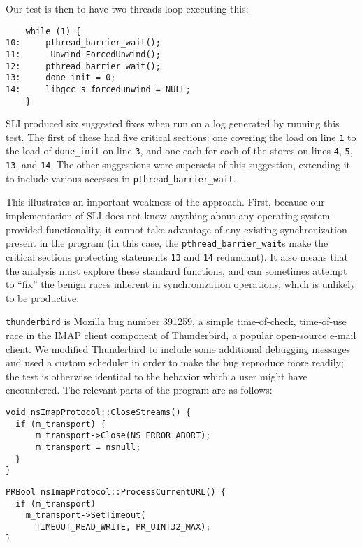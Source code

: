 \documentclass[10pt,twocolumn,preprint,natbib,authoryear]{sigplanconf}
\begin{document}
Our test is then to have two threads loop executing this:

\begin{verbatim}
    while (1) {
10:     pthread_barrier_wait();
11:     _Unwind_ForcedUnwind();
12:     pthread_barrier_wait();
13:     done_init = 0;
14:     libgcc_s_forcedunwind = NULL;
    }
\end{verbatim}

SLI produced six suggested fixes when run on a log generated by
running this test.  The first of these had five critical sections: one
covering the load on line \verb|1| to the load of \verb|done_init| on
line \verb|3|, and one each for each of the stores on lines \verb|4|,
\verb|5|, \verb|13|, and \verb|14|.  The other suggestions were
supersets of this suggestion, extending it to include various accesses
in \verb|pthread_barrier_wait|.

This illustrates an important weakness of the approach.  First,
because our implementation of SLI does not know anything about any
operating system-provided functionality, it cannot take advantage of
any existing synchronization present in the program (in this case, the
\verb|pthread_barrier_wait|s make the critical sections protecting
statements \verb|13| and \verb|14| redundant).  It also means that the
analysis must explore these standard functions, and can sometimes
attempt to ``fix'' the benign races inherent in synchronization
operations, which is unlikely to be productive.

\verb|thunderbird| is Mozilla bug number
391259\cite{thunderbird39125}, a simple time-of-check, time-of-use
race in the IMAP client component of Thunderbird, a popular
open-source e-mail client.  We modified Thunderbird to include some
additional debugging messages and used a custom scheduler in order to
make the bug reproduce more readily; the test is otherwise identical
to the behavior which a user might have encountered.  The relevant
parts of the program are as follows:

\begin{verbatim}
void nsImapProtocol::CloseStreams() {
  if (m_transport) {
      m_transport->Close(NS_ERROR_ABORT);
      m_transport = nsnull;
  }
}
\end{verbatim}

\begin{verbatim}
PRBool nsImapProtocol::ProcessCurrentURL() {
  if (m_transport)
    m_transport->SetTimeout(
      TIMEOUT_READ_WRITE, PR_UINT32_MAX);
}
\end{verbatim}
\end{document}
